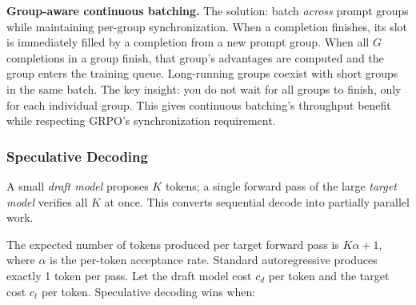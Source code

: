 \textbf{Group-aware continuous batching.} The solution: batch \textit{across} prompt groups while maintaining per-group synchronization. When a completion finishes, its slot is immediately filled by a completion from a new prompt group. When all $G$ completions in a group finish, that group's advantages are computed and the group enters the training queue. Long-running groups coexist with short groups in the same batch. The key insight: you do not wait for all groups to finish, only for each individual group. This gives continuous batching's throughput benefit while respecting GRPO's synchronization requirement.

\subsubsection*{Speculative Decoding}

A small \textit{draft model} proposes $K$ tokens; a single forward pass of the large \textit{target model} verifies all $K$ at once. This converts sequential decode into partially parallel work.

\begin{center}
\end{center}

The expected number of tokens produced per target forward pass is $K\alpha + 1$, where $\alpha$ is the per-token acceptance rate. Standard autoregressive produces exactly 1 token per pass. Let the draft model cost $c_d$ per token and the target cost $c_t$ per token. Speculative decoding wins when:


